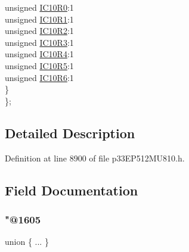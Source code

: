 \begin{DoxyCompactItemize}
\begin{tabbing}
\>\>unsigned \hyperlink{structtag_r_p_i_n_r33_b_i_t_s_a684f50de8fb5d622c3cbe7547bb5e1a8}{IC10R0}:1\\
\>\>unsigned \hyperlink{structtag_r_p_i_n_r33_b_i_t_s_a87a13e8df32d6214a0d66ec018138675}{IC10R1}:1\\
\>\>unsigned \hyperlink{structtag_r_p_i_n_r33_b_i_t_s_a80dfc8da3e99a5ee57aeadcd9b81027d}{IC10R2}:1\\
\>\>unsigned \hyperlink{structtag_r_p_i_n_r33_b_i_t_s_a66270ac8abe22f8a350d3996ac39fcc7}{IC10R3}:1\\
\>\>unsigned \hyperlink{structtag_r_p_i_n_r33_b_i_t_s_a681562cdfeaef4cfc30a61edb53ad544}{IC10R4}:1\\
\>\>unsigned \hyperlink{structtag_r_p_i_n_r33_b_i_t_s_a78da68bbf5cf5477103cea941321512c}{IC10R5}:1\\
\>\>unsigned \hyperlink{structtag_r_p_i_n_r33_b_i_t_s_a0ca9688850f308a3bfd723004db4e0a9}{IC10R6}:1\\
\>\} \\
\}; \\

\end{tabbing}\end{DoxyCompactItemize}


\subsection{Detailed Description}


Definition at line 8900 of file p33\+E\+P512\+M\+U810.\+h.



\subsection{Field Documentation}
\mbox{\label{structtag_r_p_i_n_r33_b_i_t_s_a6f25fbd67ad8f0fce8af5fd0675fb93e}} 
\subsubsection{\texorpdfstring{"@1605}{@1605}}
{\footnotesize\ttfamily union \{ ... \} }

\mbox{\label{structtag_r_p_i_n_r33_b_i_t_s_adf71f3d8410c1f1dbbc96680a92c49af}} 
